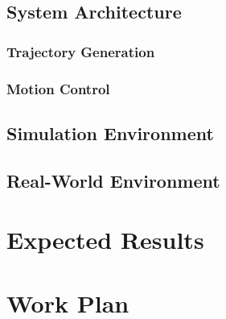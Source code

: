 \documentclass[a4paper, oneside]{article}
\begin{document}
    \subsection{System Architecture}
    \label{sec:Proposed Approach:System Architecture}
    

    \subsubsection{Trajectory Generation}
    \label{sec:Proposed Approach:Reference Trajectory}
    

    \subsubsection{Motion Control}
    \label{sec:Proposed Approach:Controler}
    

    \subsection{Simulation Environment}
    \label{sec:Proposed Approach:Simulator}
    

    \subsection{Real-World Environment}
    \label{sec:Proposed Approach:Real World}
    

    
\clearpage
\section{Expected Results}
    \label{sec:Results:Expected Results}
    

\clearpage
\section{Work Plan}
    \label{sec:Work Plan}
    
\nocite{*} %
\printbibliography[heading=bibintoc]

\appendix
\end{document}
